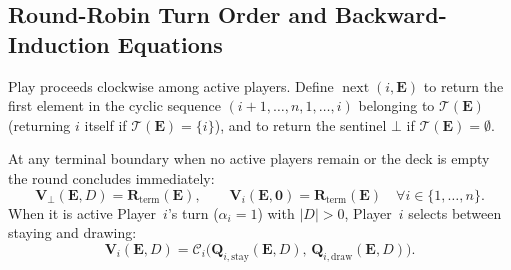 \documentclass{article}
\theoremstyle{plain}
\theoremstyle{definition}
\theoremstyle{remark}
\DeclareMathOperator{\nextplayer}{next}
\begin{document}
\subsection{Round-Robin Turn Order and Backward-Induction Equations}
Play proceeds clockwise among active players. Define $\nextplayer(i, \mathbf{E})$ to return the first element in the cyclic sequence $(i+1, \dots, n, 1, \dots, i)$ belonging to $\mathcal{T}(\mathbf{E})$ (returning $i$ itself if $\mathcal{T}(\mathbf{E}) = \{i\}$), and to return the sentinel $\bot$ if $\mathcal{T}(\mathbf{E}) = \emptyset$.

At any terminal boundary when no active players remain or the deck is empty the round concludes immediately:
\[
    \mathbf{V}_{\bot}(\mathbf{E}, D) = \mathbf{R}_{\text{term}}(\mathbf{E}), \qquad
    \mathbf{V}_i(\mathbf{E}, \mathbf{0}) = \mathbf{R}_{\text{term}}(\mathbf{E}) \quad \forall i \in \{1, \dots, n\}.
\]
When it is active Player~$i$'s turn ($\alpha_i = 1$) with $|D| > 0$, Player~$i$ selects between staying and drawing:
\[
    \mathbf{V}_i(\mathbf{E}, D) = \mathcal{C}_i \Big( \mathbf{Q}_{i,\text{stay}}(\mathbf{E}, D), \, \mathbf{Q}_{i,\text{draw}}(\mathbf{E}, D) \Big).
\]
\end{document}
